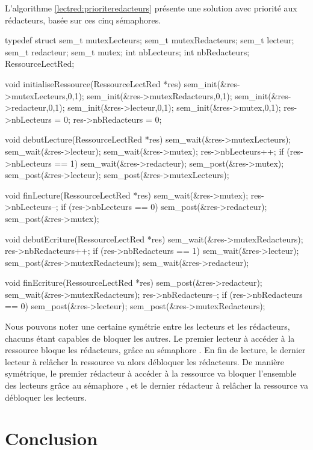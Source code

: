 L'algorithme \ref{lectred:prioriteredacteurs} présente une solution avec priorité aux rédacteurs, basée sur ces cinq sémaphores.

\begin{codeblock}[title={Lecteurs-rédacteurs: priorité aux rédacteurs},label=lectred:prioriteredacteurs]
typedef struct {
  sem_t mutexLecteurs;
  sem_t mutexRedacteurs;
  sem_t lecteur;
  sem_t redacteur;
  sem_t mutex;
  int nbLecteurs;
  int nbRedacteurs;
} RessourceLectRed;

void initialiseRessource(RessourceLectRed *res) {
  sem_init(&res->mutexLecteurs,0,1);
  sem_init(&res->mutexRedacteurs,0,1);
  sem_init(&res->redacteur,0,1);
  sem_init(&res->lecteur,0,1);
  sem_init(&res->mutex,0,1);
  res->nbLecteurs = 0;
  res->nbRedacteurs = 0;
}

void debutLecture(RessourceLectRed *res) {
  sem_wait(&res->mutexLecteurs);
  sem_wait(&res->lecteur);
  sem_wait(&res->mutex);
  res->nbLecteurs++;
  if (res->nbLecteurs == 1)
    sem_wait(&res->redacteur);
  sem_post(&res->mutex);
  sem_post(&res->lecteur);
  sem_post(&res->mutexLecteurs);
}

void finLecture(RessourceLectRed *res) {
  sem_wait(&res->mutex);
  res->nbLecteurs--;
  if (res->nbLecteurs == 0)
    sem_post(&res->redacteur);
  sem_post(&res->mutex);
}

void debutEcriture(RessourceLectRed *res) {
  sem_wait(&res->mutexRedacteurs);
  res->nbRedacteurs++;
  if (res->nbRedacteurs == 1)
    sem_wait(&res->lecteur);
  sem_post(&res->mutexRedacteurs);
  sem_wait(&res->redacteur);
}

void finEcriture(RessourceLectRed *res) {
  sem_post(&res->redacteur);
  sem_wait(&res->mutexRedacteurs);
  res->nbRedacteurs--;
  if (res->nbRedacteurs == 0)
    sem_post(&res->lecteur);
  sem_post(&res->mutexRedacteurs);
}
\end{codeblock}

Nous pouvons noter une certaine symétrie entre les lecteurs et les rédacteurs, chacuns étant capables de bloquer les autres. Le premier lecteur à accéder à la ressource bloque les rédacteurs, grâce au sémaphore . En fin de lecture, le dernier lecteur à relâcher la ressource va alors débloquer les rédacteurs. De manière symétrique, le premier rédacteur à accéder à la ressource va bloquer l'ensemble des lecteurs grâce au sémaphore , et le dernier rédacteur à relâcher la ressource va débloquer les lecteurs.

\section{Conclusion}

